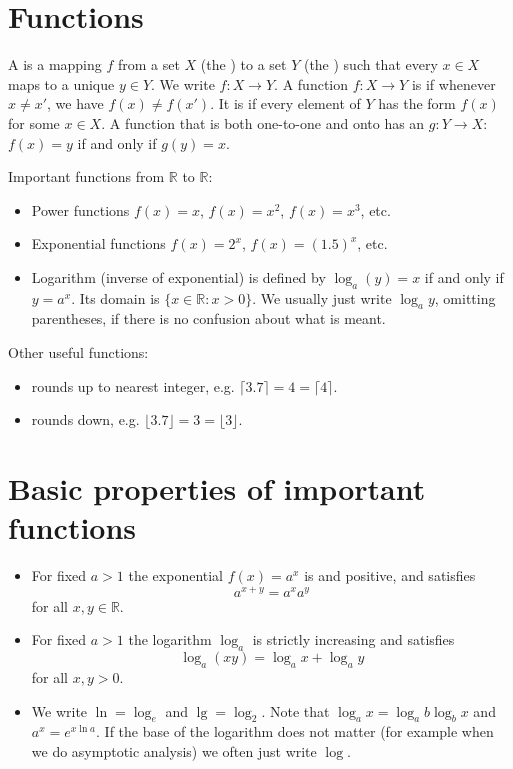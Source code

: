 \section{Functions}
A  is a mapping $f$ from a set $X$ (the ) to a set $Y$ (the ) such that every $x \in X$ maps to a unique $y \in Y$. 
We write $f \colon X \to Y$. A function $f \colon X \to Y$ is  if whenever $x \neq x'$, we have $f(x) \neq f(x')$.
It is  if every element of $Y$ has the form $f(x)$ for some $x \in X$. 
A function that is both one-to-one and onto has an  $g \colon Y \to X$: $f(x) = y$ if and only if $g(y) = x$.

Important functions from $\mathbb{R}$ to $\mathbb{R}$: 
\begin{itemize}
\item Power functions $f(x) = x$, $f(x) = x^2$, $f(x) = x^3$, etc.
\item Exponential functions $f(x) = 2^x$, $f(x) = (1.5)^x$, etc.
\item Logarithm (inverse of exponential) is defined by $\log_a (y) = x$ if and only if $y = a^x$. 
Its domain is $\{x\in \mathbb{R} : x > 0\}$. We usually just write $\log_a y$, omitting parentheses, if there is no confusion about what is meant.
\end{itemize}

Other useful functions: 
\begin{itemize}
\item {} rounds up to nearest integer, e.g. $\lceil 3.7 \rceil = 4 = \lceil 4 \rceil$.
\item {} rounds down, e.g. $\lfloor 3.7 \rfloor = 3 = \lfloor 3 \rfloor$.
\end{itemize}


\section{Basic properties of important functions}
\begin{itemize}
\item For fixed $a>1$ the exponential $f(x) = a^x$ is  and positive, 
and satisfies $$a^{x+y} = a^x a^y$$ for all $x,y\in \mathbb{R}$. 
\item For fixed $a>1$ the logarithm $\log_a$ is strictly increasing and satisfies 
$$\log_a(xy) = \log_a x + \log_a y$$ for all $x,y>0$.
\item We write $\ln = \log_e$ and $\lg = \log_2$. Note that $\log_a x = \log_a b \log_b x$ and $a^x = e^{x\ln a}$. 
If the base of the logarithm does not matter (for example when we do asymptotic analysis) we often just write $\log$.
\end{itemize}


